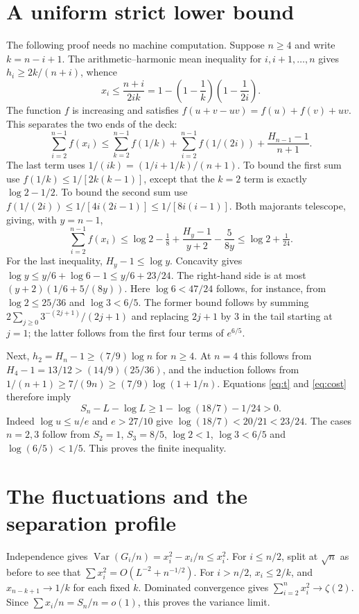 \documentclass[11pt]{article}
\newcommand{\Var}{\operatorname{Var}}
\begin{document}
\section{A uniform strict lower bound}
The following proof needs no machine computation. Suppose $n\ge4$ and write $k=n-i+1$. The arithmetic--harmonic mean inequality for $i,i+1,\ldots,n$ gives $h_i\ge2k/(n+i)$, whence
\[
 x_i\le\frac{n+i}{2ik}
 =1-\left(1-\frac1k\right)\left(1-\frac1{2i}\right).
\]
The function $f$ is increasing and satisfies
$f(u+v-uv)=f(u)+f(v)+uv$. This separates the two ends of the deck:
\[
 \sum_{i=2}^{n-1}f(x_i)\le
 \sum_{k=2}^{n-1}f(1/k)+\sum_{i=2}^{n-1}f(1/(2i))
 +\frac{H_{n-1}-1}{n+1}.
\]
The last term uses $1/(ik)=(1/i+1/k)/(n+1)$. To bound the first sum use $f(1/k)\le1/[2k(k-1)]$, except that the $k=2$ term is exactly $\log2-1/2$. To bound the second sum use $f(1/(2i))\le1/[4i(2i-1)]\le1/[8i(i-1)]$. Both majorants telescope, giving, with $y=n-1$,
\begin{equation}
 \sum_{i=2}^{n-1}f(x_i)
 \le\log2-\tfrac18+\frac{H_y-1}{y+2}-\frac5{8y}
 \le\log2+\tfrac1{24}.
 \label{eq:cost}
\end{equation}
For the last inequality, $H_y-1\le\log y$. Concavity gives
$\log y\le y/6+\log6-1\le y/6+23/24$. The right-hand side is at most $(y+2)(1/6+5/(8y))$. Here $\log6<47/24$ follows, for instance, from $\log2\le25/36$ and $\log3<6/5$. The former bound follows by summing $2\sum_{j\ge0}3^{-(2j+1)}/(2j+1)$ and replacing $2j+1$ by $3$ in the tail starting at $j=1$; the latter follows from the first four terms of $e^{6/5}$.

Next, $h_2=H_n-1\ge(7/9)\log n$ for $n\ge4$. At $n=4$ this follows from $H_4-1=13/12>(14/9)(25/36)$, and the induction follows from $1/(n+1)\ge7/(9n)\ge(7/9)\log(1+1/n)$. Equations \eqref{eq:t} and \eqref{eq:cost} therefore imply
\[
 S_n-L-\log L\ge 1-\log(18/7)-1/24>0.
\]
Indeed $\log u\le u/e$ and $e>27/10$ give $\log(18/7)<20/21<23/24$. The cases $n=2,3$ follow from $S_2=1$, $S_3=8/5$, $\log2<1$, $\log3<6/5$ and $\log(6/5)<1/5$. This proves the finite inequality.
\section{The fluctuations and the separation profile}
Independence gives $\Var(G_i/n)=x_i^2-x_i/n\le x_i^2$. For $i\le n/2$, split at $\sqrt n$ as before to see that $\sum x_i^2=O(L^{-2}+n^{-1/2})$. For $i>n/2$, $x_i\le2/k$, and $x_{n-k+1}\to1/k$ for each fixed $k$. Dominated convergence gives $\sum_{i=2}^n x_i^2\to\zeta(2)$. Since $\sum x_i/n=S_n/n=o(1)$, this proves the variance limit.
\end{document}

